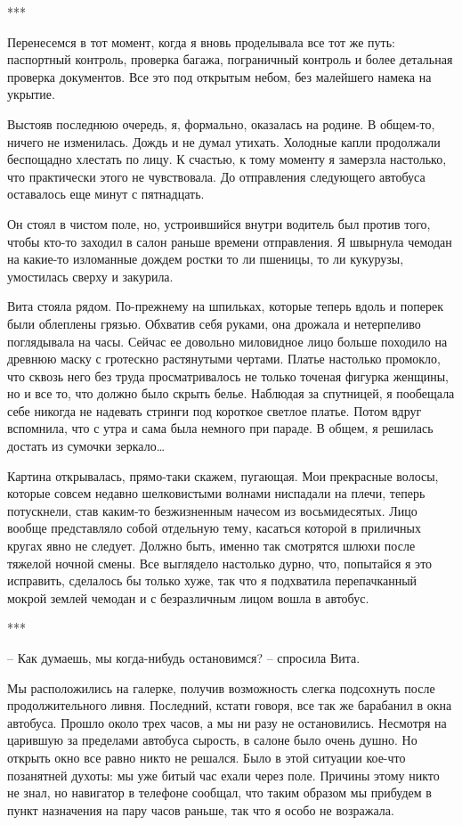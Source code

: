 \documentclass[
]{book}
\begin{document}
***

Перенесемся в тот момент, когда я вновь проделывала все тот же путь: паспортный контроль, проверка багажа, пограничный контроль и более детальная проверка документов. Все это под открытым небом, без малейшего намека на укрытие.

Выстояв последнюю очередь, я, формально, оказалась на родине. В общем-то, ничего не изменилась. Дождь и не думал утихать. Холодные капли продолжали беспощадно хлестать по лицу. К счастью, к тому моменту я замерзла настолько, что практически этого не чувствовала. До отправления следующего автобуса оставалось еще минут с пятнадцать.

Он стоял в чистом поле, но, устроившийся внутри водитель был против того, чтобы кто-то заходил в салон раньше времени отправления. Я швырнула чемодан на какие-то изломанные дождем ростки то ли пшеницы, то ли кукурузы, умостилась сверху и закурила.

Вита стояла рядом. По-прежнему на шпильках, которые теперь вдоль и поперек были облеплены грязью. Обхватив себя руками, она дрожала и нетерпеливо поглядывала на часы. Сейчас ее довольно миловидное лицо больше походило на древнюю маску с гротескно растянутыми чертами. Платье настолько промокло, что сквозь него без труда просматривалось не только точеная фигурка женщины, но и все то, что должно было скрыть белье. Наблюдая за спутницей, я пообещала себе никогда не надевать стринги под короткое светлое платье. Потом вдруг вспомнила, что с утра и сама была немного при параде. В общем, я решилась достать из сумочки зеркало\ldots{}

Картина открывалась, прямо-таки скажем, пугающая. Мои прекрасные волосы, которые совсем недавно шелковистыми волнами ниспадали на плечи, теперь потускнели, став каким-то безжизненным начесом из восьмидесятых. Лицо вообще представляло собой отдельную тему, касаться которой в приличных кругах явно не следует. Должно быть, именно так смотрятся шлюхи после тяжелой ночной смены. Все выглядело настолько дурно, что, попытайся я это исправить, сделалось бы только хуже, так что я подхватила перепачканный мокрой землей чемодан и с безразличным лицом вошла в автобус.

***

-- Как думаешь, мы когда-нибудь остановимся? -- спросила Вита.

Мы расположились на галерке, получив возможность слегка подсохнуть после продолжительного ливня. Последний, кстати говоря, все так же барабанил в окна автобуса. Прошло около трех часов, а мы ни разу не остановились. Несмотря на царившую за пределами автобуса сырость, в салоне было очень душно. Но открыть окно все равно никто не решался. Было в этой ситуации кое-что позанятней духоты: мы уже битый час ехали через поле. Причины этому никто не знал, но навигатор в телефоне сообщал, что таким образом мы прибудем в пункт назначения на пару часов раньше, так что я особо не возражала.
\end{document}
